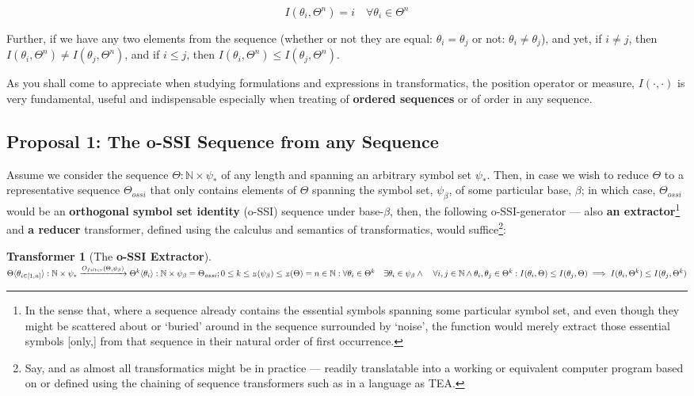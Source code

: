 \documentclass[12pt,a4paper]{article}
\newtheorem{transf}{Transformer}
\newcommand{\invpi}[1]{\mathop{\rotatebox[origin=c]{180}{$\pi$}}#1}
\begin{document}
\begin{equation}
I(\theta_i, \Theta^n) = i \quad \forall \theta_i \in \Theta^n
\end{equation}

Further, if we have any two elements from the sequence (whether or not they are equal: $\theta_i = \theta_j$ or not: $\theta_i \neq \theta_j$), and yet, if $i \neq j$, then $I(\theta_i, \Theta^n) \neq I(\theta_j, \Theta^n)$, and if $i \leq j$, then $I(\theta_i, \Theta^n) \leq I(\theta_j, \Theta^n)$. 

As you shall come to appreciate when studying formulations and expressions in transformatics, the position operator or measure, $I(\cdot, \cdot)$ is very fundamental, useful and indispensable especially when treating of \textbf{ordered sequences} or of order in any sequence.

\subsection{Proposal 1: The o-SSI Sequence from any Sequence\cite{ossipaper}}

Assume we consider the sequence $\Theta: \mathbb{N} \times \psi_*$ of any length and spanning an arbitrary symbol set $\psi_*$. Then, in case we wish to reduce $\Theta$ to a representative sequence $\Theta_{ossi}$ that only contains elements of $\Theta$ spanning the symbol set, $\psi_\beta$, of some particular base, $\beta$; in which case, $\Theta_{ossi}$ would be an \textbf{orthogonal symbol set identity} (o-SSI) sequence under base-$\beta$, then, the following o-SSI-generator --- also \textbf{an extractor}\footnote{In the sense that, where a sequence already contains the essential symbols spanning some particular symbol set, and even though they might be scattered about or `buried' around in the sequence surrounded by `noise', the function would merely extract those essential symbols [only,] from that sequence in their natural order of first occurrence.} and \textbf{a reducer} transformer, defined using the calculus and semantics of transformatics, would suffice\footnote{Say, and as almost all transformatics might be in practice --- readily translatable into a working or equivalent computer program based on or defined using the chaining of sequence transformers such as in a language as TEA\cite{cli_tttt}.}:\\


\begin{transf}[The \textbf{o-SSI Extractor}]
\label{TRANSFOSSI}
$\Theta \langle \theta_{i \in [1,n]} \rangle: \mathbb{N} \times \psi_*  \xrightarrow{O_{filter}(\Theta,\psi_\beta)} \Theta^k \langle \theta_i \rangle : \mathbb{N} \times \psi_\beta = \Theta_{ossi};\\ 0 \leq k \leq \invpi(\psi_\beta) \leq \invpi(\Theta) = n \in \mathbb{N} : \forall \theta_i \in \Theta^k \quad \exists \theta_i \in \psi_\beta \quad\\
\land \quad \forall i,j \in \mathbb{N} \land \theta_i, \theta_j \in \Theta^k: I(\theta_i,\Theta) \leq I(\theta_j,\Theta) \implies I(\theta_i,\Theta^k) \leq I(\theta_j,\Theta^k) $\\
\end{transf}
\end{document}
